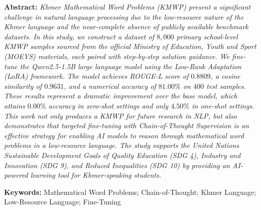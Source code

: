 \documentclass[10pt]{article}
\begin{document}
\begin{mdframed}[
    linewidth=0.4pt,
    linecolor=povteal,
    backgroundcolor=gray!10,
    innerleftmargin=5pt,
    innerrightmargin=7pt,
    innertopmargin=6pt,
    innerbottommargin=6pt,
    skipabove=5pt,
    skipbelow=5pt,
    leftline=false,
    rightline=false,
  ]
  \noindent\textbf{Abstract:}
  \textit{
    Khmer Mathematical Word Problems (KMWP) present a significant challenge in natural language
    processing due to the low-resource nature of the Khmer language and the near-complete absence
    of publicly available benchmark datasets.
    In this study, we construct a dataset of $8,000$
    primary school-level KMWP samples sourced from the official Ministry of Education, Youth and Sport
    (MOEYS) materials, each paired with step-by-step solution guidance.
    We fine-tune the
    Qwen2.5-1.5B large language model using the Low-Rank Adaptation (LoRA) framework.
    The model achieves ROUGE-L score of $0.8809$, a cosine similarity of $0.9631$, and a numerical
    accuracy of $81.00\%$ on $400$ test samples. These results represent a dramatic improvement over the base model, which attains $0.00\%$ accuracy in zero-shot settings and only $4.50\%$ in one-shot settings.
    This work not only produces a KMWP for future research in NLP, but also demonstrates that targeted fine-tuning with Chain-of-Thought
    Supervision is an effective strategy for enabling AI models to reason through mathematical
    word problems in a low-resource language. The study supports the United Nations Sustainable
    Development Goals of Quality Education (SDG 4), Industry and Innovation (SDG 9), and Reduced
    Inequalities (SDG 10) by providing an AI-powered learning tool for Khmer-speaking students.
  }
\end{mdframed}

\vspace*{-8pt}

\begin{mdframed}[
    linecolor=povteal,
    linewidth=.4pt,
    topline=false,
    bottomline=true,
    leftline=false,
    rightline=false,
    innertopmargin=6pt,
    innerbottommargin=6pt,
    innerleftmargin=6pt,
    innerrightmargin=6pt,
  ]
  \noindent\textbf{Keywords:}
  Mathematical Word Problems;
  Chain-of-Thought;
  Khmer Language;
  Low-Resource Language;
  Fine-Tuning
\end{mdframed}
\end{document}
